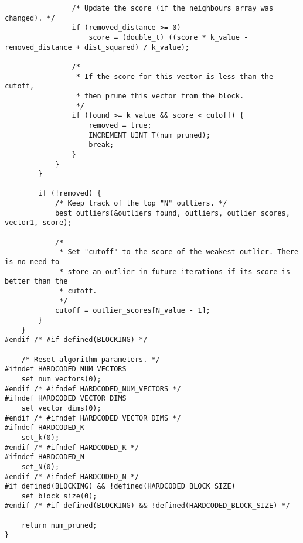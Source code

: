 \begin{lstlisting}
                /* Update the score (if the neighbours array was changed). */
                if (removed_distance >= 0)
                    score = (double_t) ((score * k_value - removed_distance + dist_squared) / k_value);
                
                /*
                 * If the score for this vector is less than the cutoff,
                 * then prune this vector from the block.
                 */
                if (found >= k_value && score < cutoff) {
                    removed = true;
                    INCREMENT_UINT_T(num_pruned);
                    break;
                }
            }
        }
        
        if (!removed) {
            /* Keep track of the top "N" outliers. */
            best_outliers(&outliers_found, outliers, outlier_scores, vector1, score);
            
            /*
             * Set "cutoff" to the score of the weakest outlier. There is no need to
             * store an outlier in future iterations if its score is better than the
             * cutoff.
             */
            cutoff = outlier_scores[N_value - 1];
        }
    }
#endif /* #if defined(BLOCKING) */

    /* Reset algorithm parameters. */
#ifndef HARDCODED_NUM_VECTORS
    set_num_vectors(0);
#endif /* #ifndef HARDCODED_NUM_VECTORS */
#ifndef HARDCODED_VECTOR_DIMS
    set_vector_dims(0);
#endif /* #ifndef HARDCODED_VECTOR_DIMS */
#ifndef HARDCODED_K
    set_k(0);
#endif /* #ifndef HARDCODED_K */
#ifndef HARDCODED_N
    set_N(0);
#endif /* #ifndef HARDCODED_N */
#if defined(BLOCKING) && !defined(HARDCODED_BLOCK_SIZE)
    set_block_size(0);
#endif /* #if defined(BLOCKING) && !defined(HARDCODED_BLOCK_SIZE) */
    
    return num_pruned;
}
\end{lstlisting}

